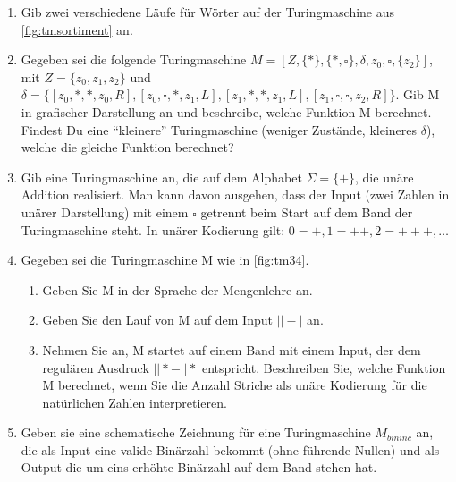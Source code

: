 \begin{enumerate}
    \item Gib zwei verschiedene Läufe für Wörter auf der Turingmaschine aus
        \autoref{fig:tmsortiment} an.
    \item Gegeben sei die folgende Turingmaschine
        $M = [Z, \{*\}, \{*, \square\}, \delta, z_0, \square, \{z_2\}]$,
        mit $Z = \{z_0, z_1, z_2\}$ und \\
        $\delta = \{
            [z_0,*,*,z_0,R],
            [z_0,\square,*,z_1,L],
            [z_1,*,*,z_1,L],
            [z_1,\square,\square,z_2,R]
        \}$.
        Gib M in grafischer Darstellung an und beschreibe, welche Funktion M berechnet.
        Findest Du eine ``kleinere'' Turingmaschine (weniger Zustände, kleineres $\delta$),
        welche die gleiche Funktion berechnet?
    \item Gib eine Turingmaschine an, die auf dem Alphabet $\Sigma = \{+\}$,
        die unäre Addition realisiert.
        Man kann davon ausgehen, dass der Input (zwei Zahlen in unärer Darstellung)
        mit einem $\square$ getrennt beim Start auf dem Band der Turingmaschine steht.
        In unärer Kodierung gilt: $0 = +, 1 = ++, 2 = +++, \ldots$
    \item Gegeben sei die Turingmaschine M wie in \autoref{fig:tm34}.
        \begin{enumerate}
            \item Geben Sie M in der Sprache der Mengenlehre an.
            \item Geben Sie den Lauf von M auf dem Input $||-|$ an.
            \item Nehmen Sie an, M startet auf einem Band mit einem Input,
                der dem regulären Ausdruck $||*-||*$ entspricht.
                Beschreiben Sie, welche Funktion M berechnet, wenn Sie die Anzahl Striche als
                unäre Kodierung für die natürlichen Zahlen interpretieren.
        \end{enumerate}
    \item Geben sie eine schematische Zeichnung für eine Turingmaschine $M_{bininc}$ an,
        die als Input eine valide Binärzahl bekommt (ohne führende Nullen) und als
        Output die um eins erhöhte Binärzahl auf dem Band stehen hat.
\end{enumerate}

